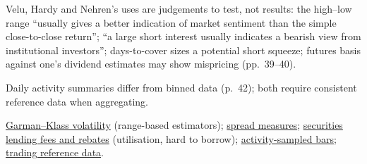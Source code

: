 \begin{qfdata}
 Velu, Hardy and Nehren's uses are judgements to test, not results: the high--low range ``usually gives a better indication of market sentiment than the simple close-to-close return''; ``a large short interest usually indicates a bearish view from institutional investors''; days-to-cover sizes a potential short squeeze; futures basis against one's dividend estimates may show mispricing (pp.~39--40).

 Daily activity summaries differ from binned data (p.~42); both require consistent reference data when aggregating.

 \hyperref[meth:garman-klass-volatility]{Garman--Klass volatility} (range-based estimators); \hyperref[def:spread-measures]{spread measures}; \hyperref[def:securities-lending-fee-rebate]{securities lending fees and rebates} (utilisation, hard to borrow); \hyperref[meth:activity-sampled-bars]{activity-sampled bars}; \hyperref[data:trading-reference-data]{trading reference data}.

\end{qfdata}

